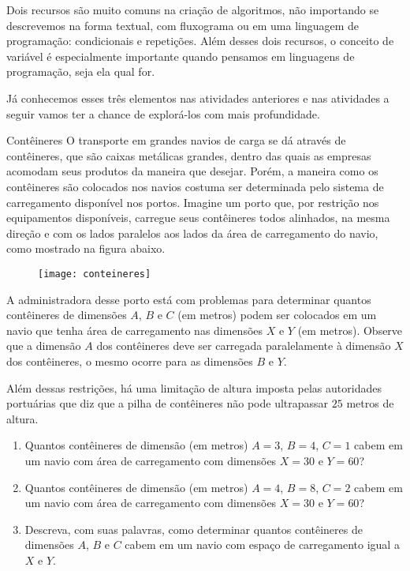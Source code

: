 Dois recursos são muito comuns na criação de algoritmos, não importando se descrevemos na forma textual, com fluxograma ou em uma linguagem de programação: condicionais e repetições. Além desses dois recursos, o conceito de variável é especialmente importante quando pensamos em linguagens de programação, seja ela qual for.

Já conhecemos esses três elementos nas atividades anteriores e nas atividades a seguir vamos ter a chance de explorá-los com mais profundidade.

\begin{task}{Contêineres}
\label{comp-task4}
O transporte em grandes navios de carga se dá através de contêineres, que são caixas metálicas grandes, dentro das quais as empresas acomodam seus produtos da maneira que desejar. Porém, a maneira como os contêineres são colocados nos navios costuma ser determinada pelo sistema de carregamento disponível nos portos. Imagine um porto que, por restrição nos equipamentos disponíveis, carregue seus contêineres todos alinhados, na mesma direção e com os lados paralelos aos lados da área de carregamento do navio, como mostrado na figura abaixo.

\begin{figure}[H]
\centering

\texttt{[image: conteineres]}
\end{figure}

A administradora desse porto está com problemas para determinar quantos contêineres de dimensões $A$, $B$ e $C$ (em metros) podem ser colocados em um navio que tenha área de carregamento nas dimensões $X$ e $Y$ (em metros). Observe que a dimensão $A$ dos contêineres deve ser carregada paralelamente à dimensão $X$ dos contêineres, o mesmo ocorre para as dimensões $B$ e $Y$.

Além dessas restrições, há uma limitação de altura imposta pelas autoridades portuárias que diz que a pilha de contêineres não pode ultrapassar $25$ metros de altura.

\begin{enumerate}
\item Quantos contêineres de dimensão (em metros) $A=3$, $B=4$, $C=1$ cabem em um navio com área de carregamento com dimensões $X=30$ e $Y=60$?

\item Quantos contêineres de dimensão (em metros) $A=4$, $B=8$, $C=2$ cabem em um navio com área de carregamento com dimensões $X=30$ e $Y=60$?

\item Descreva, com suas palavras, como determinar quantos contêineres de dimensões $A$, $B$ e $C$ cabem em um navio com espaço de carregamento igual a $X$ e $Y$.
\end{enumerate}
\end{task}

